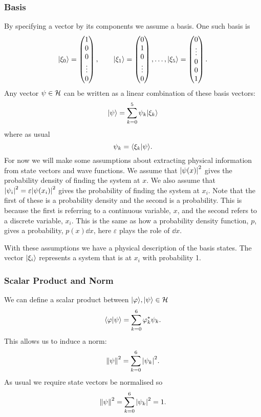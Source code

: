     \subsubsection{Basis}
    By specifying a vector by its components we assume a basis.
    One such basis is
    \[
        \vert {\xi_0} \rangle =
        \begin{pmatrix}
            1\\ 0\\ 0\\ \vdots\\ 0
        \end{pmatrix}
        ,\qquad\vert {\xi_1} \rangle =
        \begin{pmatrix}
            0\\ 1\\ 0\\ \vdots\\ 0
        \end{pmatrix}
        ,\dotsc, \vert {\xi_5} \rangle =
        \begin{pmatrix}
            0\\ \vdots\\ 0\\ 0\\ 1
        \end{pmatrix}
        .
    \]
    Any vector \(\psi\in\mathcal{H}\) can be written as a linear combination of these basis vectors:
    \[\vert {\psi} \rangle = \sum_{k=0}^{5} \psi_k\vert {\xi_k} \rangle\]
    where as usual
    \[\psi_k = \langle {\xi_k} \vert {\psi} \rangle.\]
    For now we will make some assumptions about extracting physical information from state vectors and wave functions.
    We assume that \(\abs{\psi(x)}^2\) gives the probability density of finding the system at \(x\).
    We also assume that \(\abs{\psi_i}^2 = \varepsilon\abs{\psi(x_i)}^2\) gives the probability of finding the system at \(x_i\).
    Note that the first of these is a probability density and the second is a probability.
    This is because the first is referring to a continuous variable, \(x\), and the second refers to a discrete variable, \(x_i\).
    This is the same as how a probability density function, \(p\), gives a probability, \(p(x)\dd{x}\), here \(\varepsilon\) plays the role of \(\dd{x}\).
    
    With these assumptions we have a physical description of the basis states.
    The vector \(\vert {\xi_i} \rangle\) represents a system that is at \(x_i\) with probability 1.
    
    \subsubsection{Scalar Product and Norm}
    We can define a scalar product between \(\vert {\varphi} \rangle, \vert {\psi} \rangle\in\mathcal{H}\)
    \[\langle {\varphi} \vert {\psi} \rangle = \sum_{k=0}^{6} \varphi_k^*\psi_k.\]
    This allows us to induce a norm:
    \[\norm{\psi}^2 = \sum_{k=0}^{6} \abs{\psi_k}^2.\]
    As usual we require state vectors be normalised so
    \[\norm{\psi}^2 = \sum_{k=0}^{6} \abs{\psi_k}^2 = 1.\]
    
